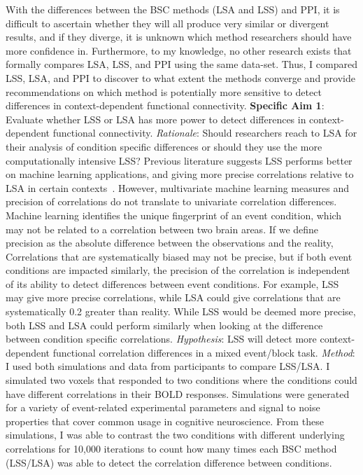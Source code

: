 \documentclass[phd,figures,tables,ackpage,abstractpage,publicabstractpage]{uithesis}
\begin{document}
With the differences between the BSC methods (LSA and LSS)
and PPI, it is difficult to ascertain whether
they will all produce very similar or divergent results, and if they 
diverge, it is unknown which method researchers should have more confidence in.
Furthermore, to my knowledge, no other research exists that formally compares
LSA, LSS, and PPI using the same data-set.
Thus, I compared LSS, LSA, and PPI to discover to what extent the methods converge and provide
recommendations on which method is potentially more sensitive to detect
differences in context-dependent functional connectivity.
\newline
\newline
\textbf{Specific Aim 1}: Evaluate whether LSS or LSA has more power to detect
differences in context-dependent functional connectivity.
\newline
\newline
\textit{Rationale}: Should researchers reach to LSA for their analysis of condition specific differences
or should they use the more computationally intensive LSS?
Previous literature suggests LSS performs better on machine learning applications, and giving
more precise correlations relative to LSA in certain contexts~\cite{Abdulrahman2016,Mumford2012,Turner2012a,Cisler2012}.
However, multivariate machine learning measures and precision of correlations do not translate to
univariate correlation differences.
Machine learning identifies the unique fingerprint of an event condition, which may not be related
to a correlation between two brain areas.
If we define precision as the absolute difference between the observations and the reality,
Correlations that are systematically biased may not be precise, but if both event conditions are
impacted similarly, the precision of the correlation is independent of its ability to
detect differences between event conditions.
For example, LSS may give more precise correlations, while LSA could give
correlations that are systematically 0.2 greater than reality.
While LSS would be deemed more precise, both LSS and LSA could perform similarly
when looking at the difference between condition specific correlations.
\newline
\newline
\textit{Hypothesis}:
LSS will detect more context-dependent functional correlation differences in a mixed event/block task.
\newline
\newline
\textit{Method}:
I used both simulations and data from participants to compare LSS/LSA.
I simulated two voxels that responded to two conditions where the conditions
could have different correlations in their BOLD responses.
Simulations were generated for a variety of event-related experimental parameters and
signal to noise properties that cover common usage in cognitive neuroscience.
From these simulations, I was able to contrast the two conditions with different
underlying correlations for 10,000  iterations to count how many times
each BSC method (LSS/LSA) was able to detect the correlation difference between conditions.
\end{document}
